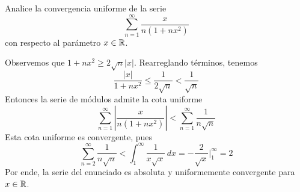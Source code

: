 \begin{exercise}
Analice la convergencia uniforme de la serie
$$\sum_{n=1}^\infty \frac x {n (1 + nx^2)}$$
con respecto al parámetro $x \in \mathbb R$.
\end{exercise}

\begin{solution}
Observemos que $1 + nx^2 \ge 2 \sqrt n |x|$. Rearreglando términos, tenemos
$$\frac {|x|} {1 + nx^2} \le \frac 1 {2 \sqrt n} < \frac 1 {\sqrt n}$$
Entonces la serie de módulos admite la cota uniforme
$$\sum_{n=1}^\infty \left| \frac x {n (1 + nx^2)} \right| < \sum_{n=1}^\infty \frac 1 {n \sqrt n}$$
Esta cota uniforme es convergente, pues
$$
\sum_{n=2}^\infty \frac 1 {n \sqrt n}
    < \int_1^\infty \frac 1 {x \sqrt x} \, dx
    = -\frac 2 {\sqrt x} \Bigg \vert_1^\infty
    = 2
$$
Por ende, la serie del enunciado es absoluta y uniformemente convergente para $x \in \mathbb R$.
\end{solution}
